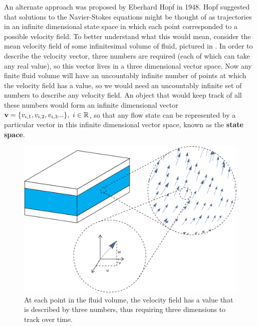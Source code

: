 {An alternate approach was proposed by Eberhard Hopf in 1948. Hopf suggested that solutions to the Navier-Stokes equations might be thought of as trajectories in an infinite dimensional state space in which each point corresponded to a possible velocity field. To better understand what this would mean, consider the mean velocity field of some infinitesimal volume of fluid, pictured in . In order to describe the velocity vector, three numbers are required (each of which can take any real value), so this vector lives in a three dimensional vector space. Now any finite fluid volume will have an uncountably infinite number of points at which the velocity field has a value, so we would need an uncountably infinite set of numbers to describe any velocity field. An object that would keep track of all these numbers would form an infinite dimensional vector $\mathbf{v} = \{v_{i,1},v_{i,2},v_{i,3}...\},~i \in \mathbb{R}$, so that any flow state can be represented by a particular vector in this infinite dimensional vector space, known as the {\bf state space}. 
\begin{figure}
\centerline{
\includegraphics[scale=0.6]{Figs/VectorSpace}}
\caption{At each point in the fluid volume, the velocity field has a value that is described by three numbers, thus requiring three dimensions to track over time.}\label{fig:VectorSpace}
\end{figure}
}
